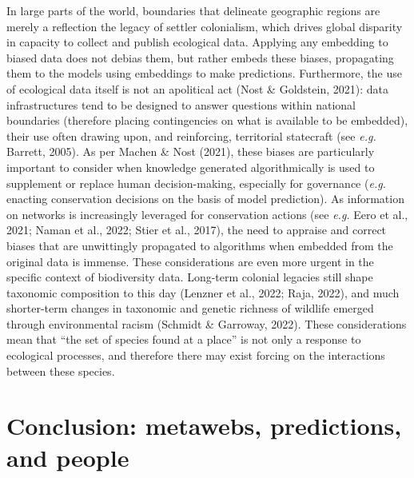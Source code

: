 \documentclass[11pt]{article}
\begin{document}
In large parts of the world, boundaries that delineate geographic
regions are merely a reflection the legacy of settler colonialism, which
drives global disparity in capacity to collect and publish ecological
data. Applying any embedding to biased data does not debias them, but
rather embeds these biases, propagating them to the models using
embeddings to make predictions. Furthermore, the use of ecological data
itself is not an apolitical act (Nost \& Goldstein, 2021): data
infrastructures tend to be designed to answer questions within national
boundaries (therefore placing contingencies on what is available to be
embedded), their use often drawing upon, and reinforcing, territorial
statecraft (see \emph{e.g.} Barrett, 2005). As per Machen \& Nost
(2021), these biases are particularly important to consider when
knowledge generated algorithmically is used to supplement or replace
human decision-making, especially for governance (\emph{e.g.} enacting
conservation decisions on the basis of model prediction). As information
on networks is increasingly leveraged for conservation actions (see
\emph{e.g.} Eero et al., 2021; Naman et al., 2022; Stier et al., 2017),
the need to appraise and correct biases that are unwittingly propagated
to algorithms when embedded from the original data is immense. These
considerations are even more urgent in the specific context of
biodiversity data. Long-term colonial legacies still shape taxonomic
composition to this day (Lenzner et al., 2022; Raja, 2022), and much
shorter-term changes in taxonomic and genetic richness of wildlife
emerged through environmental racism (Schmidt \& Garroway, 2022). These
considerations mean that ``the set of species found at a place'' is not
only a response to ecological processes, and therefore there may exist
forcing on the interactions between these species.

\hypertarget{conclusion-metawebs-predictions-and-people}{%
\section{Conclusion: metawebs, predictions, and
people}\label{conclusion-metawebs-predictions-and-people}}
\end{document}
